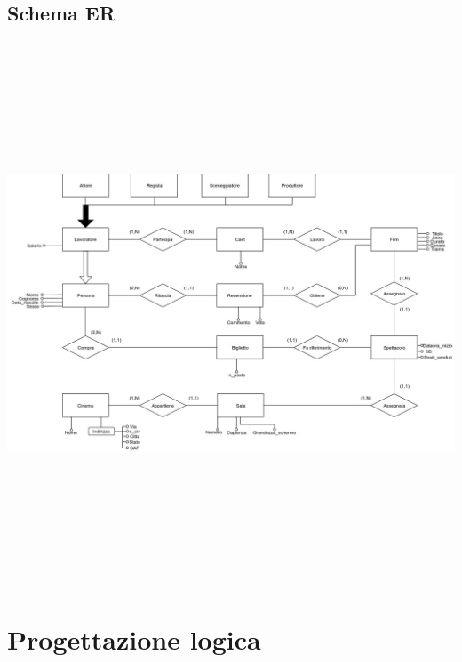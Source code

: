 \documentclass[10pt]{article}
\begin{document}
	\subsection{Schema ER}	
	\includegraphics[width=\textwidth, height=16.1cm]{Schemas/SchemaER}
	\section{Progettazione logica}
\end{document}
